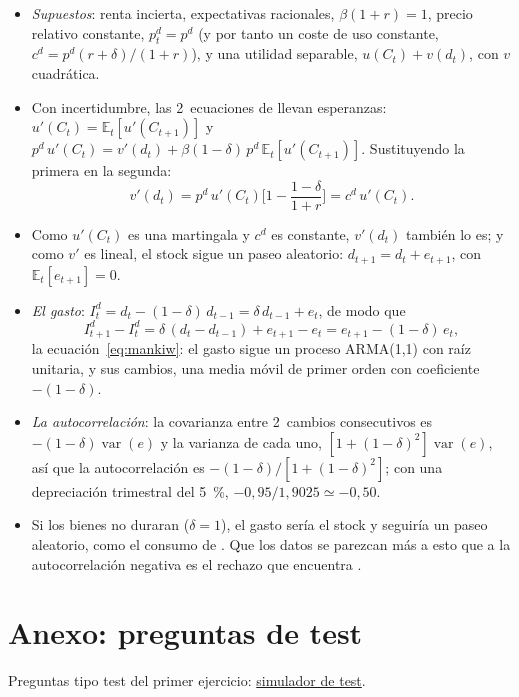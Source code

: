 \documentclass[11pt]{article}
\begin{document}
\begin{itemize}
\item \emph{Supuestos}: renta incierta, expectativas racionales, $\beta(1+r)=1$, precio relativo constante, $p^d_t=p^d$ (y por tanto un coste de uso constante, $c^d=p^d(r+\delta)/(1+r)$), y una utilidad separable, $u(C_t)+v(d_t)$, con $v$ cuadrática.
\item Con incertidumbre, las 2~ecuaciones de  llevan esperanzas: $u'(C_t)=\mathbb{E}_t[u'(C_{t+1})]$ y $p^d\,u'(C_t)=v'(d_t)+\beta(1-\delta)\,p^d\,\mathbb{E}_t[u'(C_{t+1})]$. Sustituyendo la primera en la segunda:
  \begin{equation*}
  v'(d_t)=p^d\,u'(C_t)\Big[1-\frac{1-\delta}{1+r}\Big]=c^d\,u'(C_t).
  \end{equation*}
\item Como $u'(C_t)$ es una martingala y $c^d$ es constante, $v'(d_t)$ también lo es; y como $v'$ es lineal, el stock sigue un paseo aleatorio: $d_{t+1}=d_t+e_{t+1}$, con $\mathbb{E}_t[e_{t+1}]=0$.
\item \emph{El gasto}: $I^d_t=d_t-(1-\delta)\,d_{t-1}=\delta\,d_{t-1}+e_t$, de modo que
  \begin{equation*}
  I^d_{t+1}-I^d_t=\delta\,(d_t-d_{t-1})+e_{t+1}-e_t=e_{t+1}-(1-\delta)\,e_t,
  \end{equation*}
  la ecuación~\eqref{eq:mankiw}: el gasto sigue un proceso ARMA(1,1) con raíz unitaria, y sus cambios, una media móvil de primer orden con coeficiente $-(1-\delta)$.
\item \emph{La autocorrelación}: la covarianza entre 2~cambios consecutivos es $-(1-\delta)\operatorname{var}(e)$ y la varianza de cada uno, $[1+(1-\delta)^2]\operatorname{var}(e)$, así que la autocorrelación es $-(1-\delta)/[1+(1-\delta)^2]$; con una depreciación trimestral del 5~\%, $-0{,}95/1{,}9025\simeq-0{,}50$.
\item Si los bienes no duraran ($\delta=1$), el gasto sería el stock y seguiría un paseo aleatorio, como el consumo de . Que los datos se parezcan más a esto que a la autocorrelación negativa es el rechazo que encuentra .\findemo
\end{itemize}

\section{Anexo: preguntas de test}\label{anexo:test}

\begin{anotaciones}
Preguntas tipo test del primer ejercicio: \href{https://www.victorgutierrezmarcos.es/oposicion/temario/primer-ejercicio/test/simulador.html?tema=3.A.33}{simulador de test}.
\end{anotaciones}

\bibliografia
\end{document}
